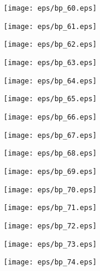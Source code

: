 \documentclass{book}
\begin{document}
	\clearpage\begin{figure}[p]
    \centering
	\texttt{[image: eps/bp\_60.eps]}
	\end{figure}
	\clearpage\begin{figure}[p]
    \centering
	\texttt{[image: eps/bp\_61.eps]}
	\end{figure}
	\clearpage\begin{figure}[p]
    \centering
	\texttt{[image: eps/bp\_62.eps]}
	\end{figure}
	\clearpage\begin{figure}[p]
    \centering
	\texttt{[image: eps/bp\_63.eps]}
	\end{figure}
	\clearpage\begin{figure}[p]
    \centering
	\texttt{[image: eps/bp\_64.eps]}
	\end{figure}
	\clearpage\begin{figure}[p]
    \centering
	\texttt{[image: eps/bp\_65.eps]}
	\end{figure}
	\clearpage\begin{figure}[p]
    \centering
	\texttt{[image: eps/bp\_66.eps]}
	\end{figure}
	\clearpage\begin{figure}[p]
    \centering
	\texttt{[image: eps/bp\_67.eps]}
	\end{figure}
	\clearpage\begin{figure}[p]
    \centering
	\texttt{[image: eps/bp\_68.eps]}
	\end{figure}
	\clearpage\begin{figure}[p]
    \centering
	\texttt{[image: eps/bp\_69.eps]}
	\end{figure}
	\clearpage\begin{figure}[p]
    \centering
	\texttt{[image: eps/bp\_70.eps]}
	\end{figure}
	\clearpage\begin{figure}[p]
    \centering
	\texttt{[image: eps/bp\_71.eps]}
	\end{figure}
	\clearpage\begin{figure}[p]
    \centering
	\texttt{[image: eps/bp\_72.eps]}
	\end{figure}
	\clearpage\begin{figure}[p]
    \centering
	\texttt{[image: eps/bp\_73.eps]}
	\end{figure}
	\clearpage\begin{figure}[p]
    \centering
	\texttt{[image: eps/bp\_74.eps]}
	\end{figure}
\end{document}
